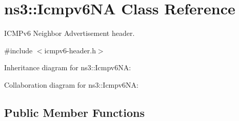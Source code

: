 \hypertarget{classns3_1_1Icmpv6NA}{}\section{ns3\+:\+:Icmpv6\+NA Class Reference}
\label{classns3_1_1Icmpv6NA}


I\+C\+M\+Pv6 Neighbor Advertisement header.  




{\ttfamily \#include $<$icmpv6-\/header.\+h$>$}



Inheritance diagram for ns3\+:\+:Icmpv6\+NA\+:


Collaboration diagram for ns3\+:\+:Icmpv6\+NA\+:
\subsection*{Public Member Functions}
